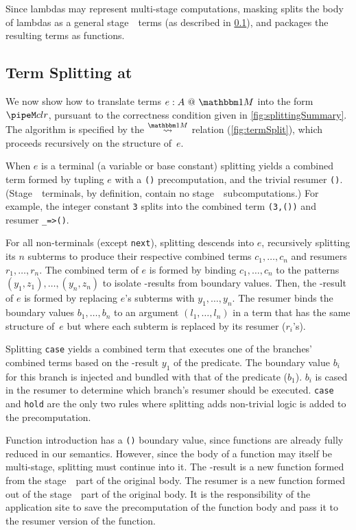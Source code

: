 \begin{abstrsyn}
Since lambdas may represent multi-stage computations, 
masking splits the body of lambdas as a general stage~\bbone\ terms (as described in \ref{sec:split-one}), 
and packages the resulting terms as functions.

\subsection{Term Splitting at \bbonem}
\label{sec:split-one}

We now show how to translate terms $\colone e A$ into the form $\pipeM c l r$,
pursuant to the correctness condition given in \ref{fig:splittingSummary}.
The algorithm is specified by the $\splitonesym$ relation (\cref{fig:termSplit}), 
which proceeds recursively on the structure of~$e$.

When $e$ is a terminal (a variable or base constant)
splitting yields a combined term formed by tupling $e$ with a \texttt{()} precomputation, 
and the trivial resumer \texttt{()}. 
(Stage~\bbone\ terminals, by definition, contain no stage~\bbtwo\ subcomputations.)  
For example, the integer constant \texttt{3} splits into the combined term \texttt{(3,())} and resumer \texttt{\_=>()}.

For all non-terminals (except \texttt{next}),
splitting descends into $e$, recursively splitting its $n$ subterms
to produce their respective combined terms $c_1,\ldots,c_n$ and resumers $r_1, \ldots, r_n$.
The combined term of $e$ is formed by binding $c_1,\ldots,c_n$
to the patterns $(y_1,z_1),\ldots,(y_n,z_n)$
to isolate \bbone-results from boundary values. Then,
the \bbone-result of $e$ is formed by replacing $e$'s subterms with $y_1,\ldots,y_n$.
The resumer binds the boundary values $b_1,\ldots,b_n$ to an
argument $(l_1,\ldots,l_n)$ in a term that has the same structure
of~$e$ but where each subterm is replaced by its resumer ($r_i$'s).

Splitting {\tt case} yields a combined term that executes one of the branches' combined terms based on the \bbone-result $y_1$ of the predicate.
The boundary value $b_i$ for this branch is injected and bundled with that of the predicate ($b_1$).   
$b_i$ is cased in the resumer to determine which branch's resumer should be executed.
{\tt case} and \texttt{hold} are the only two rules where splitting adds non-trivial logic is added to the precomputation.

Function introduction has a \texttt{()} boundary value,
since functions are already fully reduced in our semantics.
However, since the body of a function may itself be multi-stage, splitting must continue into it.
The \bbone-result is a new function formed from the stage~\bbone\ part of the original body.
The resumer is a new function formed out of the stage~\bbtwo\ part of the original body.
It is the responsibility of the application site to save the precomputation of the function body
and pass it to the resumer version of the function.


\end{abstrsyn}
